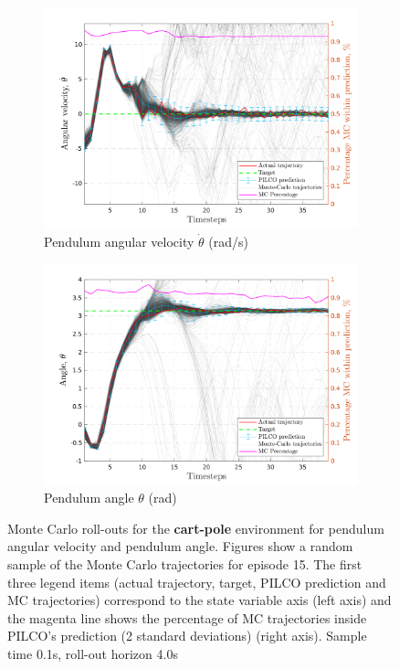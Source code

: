  
\begin{figure}[htbp]    
  \begin{subfigure}[b]{1\linewidth}
    \centering
    \includegraphics[height=0.4\textheight,width=1\textwidth]{Chapter3/Figures/cp_MC_rollout_Ep_15_Dim_3.png} 
    \caption{Pendulum angular velocity $\dot \theta$ (rad/s)} 
    \label{Fig:Re-cp-pen-velocity} 
  \end{subfigure} 

  \begin{subfigure}[b]{1\linewidth}
    \centering
    \includegraphics[height=0.4\textheight,width=1\textwidth]{Chapter3/Figures/cp_MC_rollout_Ep_15_Dim_4.png} 
    \caption{Pendulum angle $\theta$ (rad)} 
    \label{Fig:Re-cp-pen-angle} 
  \end{subfigure} 
\caption[Monte Carlo roll-outs for \textbf{cart-pole} pendulum angular velocity and pendulum angle]{Monte Carlo roll-outs for the \textbf{cart-pole} environment for pendulum angular velocity and pendulum angle. Figures show a random sample of the Monte Carlo trajectories for episode 15. The first three legend items (actual trajectory, target, PILCO prediction and MC trajectories) correspond to the state variable axis (left axis) and the magenta line shows the percentage of MC trajectories inside PILCO's prediction (2 standard deviations) (right axis). Sample time 0.1s, roll-out horizon 4.0s}
\label{Fig:Re-cp-MC-roll-outs-2} 
\end{figure}
 
